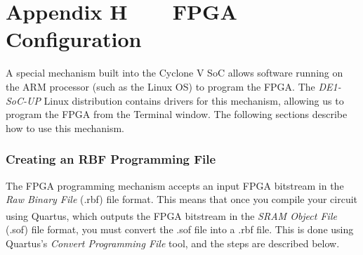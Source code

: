 \documentclass[11pt, twoside, pdftex]{article}
\begin{document}
\newpage
\section*{Appendix H~~~~FPGA Configuration}

A special mechanism built into the Cyclone V SoC allows software running on the ARM processor
(such as the Linux OS) to program the FPGA. The \textit{DE1-SoC-UP} Linux distribution contains 
drivers for this mechanism, allowing us to program the FPGA from the Terminal window. The 
following sections describe how to use this mechanism.

\subsubsection*{Creating an RBF Programming File}
\label{sec:create_rbf_file}

The FPGA programming mechanism accepts an input FPGA bitstream in the \textit{Raw Binary File} (.rbf) file format. This means that once you compile your circuit using Quartus\textsuperscript{\textregistered}, which outputs the FPGA bitstream in the \textit{SRAM Object File} (.sof) file format, you must convert the .sof file into a .rbf file. This is done using Quartus's \textit{Convert Programming File} tool, and the steps are described below.
\end{document}
